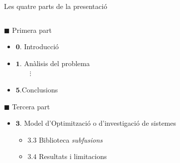 \documentclass[twocolumn]{beamer}
\begin{document}
\begin{frame}{Les quatre parts de la presentació}
\begin{columns}[t]
\begin{column}{.5\textwidth}
       \begin{block}{$\blacksquare$ Primera part }
       	\begin{itemize}
       		\small
       		\item $\mathbf{0.}$ Introducció
       		\item $\mathbf{1.}$ Anàlisis del problema \\ $\quad \quad \vdots$
       		\item $\mathbf{5.}$Conclusions
       	\end{itemize}
       \normalsize
       \end{block}
  \begin{block}{$\blacksquare$ Tercera part }
  	\begin{itemize}
  		\small
  		\item $\mathbf{3.}$ Model d’Optimització o d’investigació de sistemes
  		\begin{itemize}
  			\footnotesize
  			\item $\mathbf{3.3}$ Biblioteca \textit{subfusions}
  			\item $\mathbf{3.4}$ Resultats i limitacions 
  		\end{itemize}
  	\end{itemize}
  \end{block}
\end{column}
\begin{column}{.5\textwidth}


\end{column}
\end{columns}
\end{frame}
\end{document}
